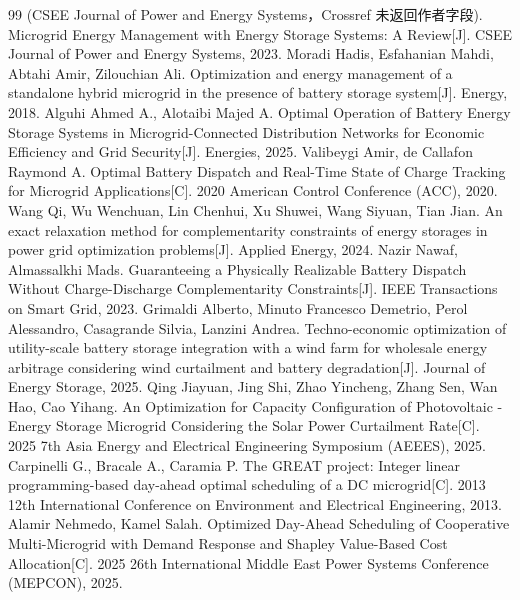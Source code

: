 \begin{thebibliography}{99}
\footnotesize
\setlength{\itemsep}{0.6pt}
\setlength{\parsep}{0pt}
\setlength{\parskip}{0pt}
(CSEE Journal of Power and Energy Systems，Crossref 未返回作者字段). Microgrid Energy Management with Energy Storage Systems: A Review[J]. CSEE Journal of Power and Energy Systems, 2023.
Moradi Hadis, Esfahanian Mahdi, Abtahi Amir, Zilouchian Ali. Optimization and energy management of a standalone hybrid microgrid in the presence of battery storage system[J]. Energy, 2018.
Alguhi Ahmed A., Alotaibi Majed A. Optimal Operation of Battery Energy Storage Systems in Microgrid-Connected Distribution Networks for Economic Efficiency and Grid Security[J]. Energies, 2025.
Valibeygi Amir, de Callafon Raymond A. Optimal Battery Dispatch and Real-Time State of Charge Tracking for Microgrid Applications[C]. 2020 American Control Conference (ACC), 2020.
Wang Qi, Wu Wenchuan, Lin Chenhui, Xu Shuwei, Wang Siyuan, Tian Jian. An exact relaxation method for complementarity constraints of energy storages in power grid optimization problems[J]. Applied Energy, 2024.
Nazir Nawaf, Almassalkhi Mads. Guaranteeing a Physically Realizable Battery Dispatch Without Charge-Discharge Complementarity Constraints[J]. IEEE Transactions on Smart Grid, 2023.
Grimaldi Alberto, Minuto Francesco Demetrio, Perol Alessandro, Casagrande Silvia, Lanzini Andrea. Techno-economic optimization of utility-scale battery storage integration with a wind farm for wholesale energy arbitrage considering wind curtailment and battery degradation[J]. Journal of Energy Storage, 2025.
Qing Jiayuan, Jing Shi, Zhao Yincheng, Zhang Sen, Wan Hao, Cao Yihang. An Optimization for Capacity Configuration of Photovoltaic - Energy Storage Microgrid Considering the Solar Power Curtailment Rate[C]. 2025 7th Asia Energy and Electrical Engineering Symposium (AEEES), 2025.
Carpinelli G., Bracale A., Caramia P. The GREAT project: Integer linear programming-based day-ahead optimal scheduling of a DC microgrid[C]. 2013 12th International Conference on Environment and Electrical Engineering, 2013.
Alamir Nehmedo, Kamel Salah. Optimized Day-Ahead Scheduling of Cooperative Multi-Microgrid with Demand Response and Shapley Value-Based Cost Allocation[C]. 2025 26th International Middle East Power Systems Conference (MEPCON), 2025.

\end{thebibliography}
